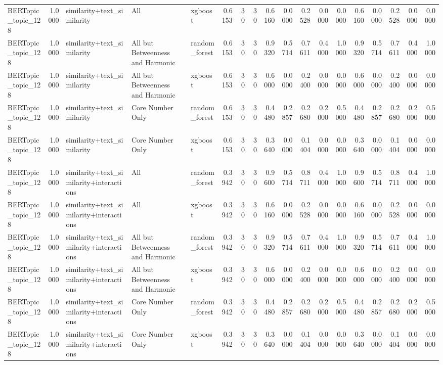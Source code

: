 \begin{tabular}{lrlllrrrrrrrrrrrrr}
BERTopic_topic_128 & 1.0000 & similarity+text_similarity & All & xgboost & 0.6153 & 30 & 30 & 0.6160 & 0.0000 & 0.2528 & 0.0000 & 0.0000 & 0.6160 & 0.0000 & 0.2528 & 0.0000 & 0.0000 \\
BERTopic_topic_128 & 1.0000 & similarity+text_similarity & All but Betweenness and Harmonic & random_forest & 0.6153 & 30 & 30 & 0.9320 & 0.5714 & 0.7611 & 0.4000 & 1.0000 & 0.9320 & 0.5714 & 0.7611 & 0.4000 & 1.0000 \\
BERTopic_topic_128 & 1.0000 & similarity+text_similarity & All but Betweenness and Harmonic & xgboost & 0.6153 & 30 & 30 & 0.6000 & 0.0000 & 0.2400 & 0.0000 & 0.0000 & 0.6000 & 0.0000 & 0.2400 & 0.0000 & 0.0000 \\
BERTopic_topic_128 & 1.0000 & similarity+text_similarity & Core Number Only & random_forest & 0.6153 & 30 & 30 & 0.4480 & 0.2857 & 0.2680 & 0.2000 & 0.5000 & 0.4480 & 0.2857 & 0.2680 & 0.2000 & 0.5000 \\
BERTopic_topic_128 & 1.0000 & similarity+text_similarity & Core Number Only & xgboost & 0.6153 & 30 & 30 & 0.3640 & 0.0000 & 0.1404 & 0.0000 & 0.0000 & 0.3640 & 0.0000 & 0.1404 & 0.0000 & 0.0000 \\
BERTopic_topic_128 & 1.0000 & similarity+text_similarity+interactions & All & random_forest & 0.3942 & 30 & 30 & 0.9600 & 0.5714 & 0.8711 & 0.4000 & 1.0000 & 0.9600 & 0.5714 & 0.8711 & 0.4000 & 1.0000 \\
BERTopic_topic_128 & 1.0000 & similarity+text_similarity+interactions & All & xgboost & 0.3942 & 30 & 30 & 0.6160 & 0.0000 & 0.2528 & 0.0000 & 0.0000 & 0.6160 & 0.0000 & 0.2528 & 0.0000 & 0.0000 \\
BERTopic_topic_128 & 1.0000 & similarity+text_similarity+interactions & All but Betweenness and Harmonic & random_forest & 0.3942 & 30 & 30 & 0.9320 & 0.5714 & 0.7611 & 0.4000 & 1.0000 & 0.9320 & 0.5714 & 0.7611 & 0.4000 & 1.0000 \\
BERTopic_topic_128 & 1.0000 & similarity+text_similarity+interactions & All but Betweenness and Harmonic & xgboost & 0.3942 & 30 & 30 & 0.6000 & 0.0000 & 0.2400 & 0.0000 & 0.0000 & 0.6000 & 0.0000 & 0.2400 & 0.0000 & 0.0000 \\
BERTopic_topic_128 & 1.0000 & similarity+text_similarity+interactions & Core Number Only & random_forest & 0.3942 & 30 & 30 & 0.4480 & 0.2857 & 0.2680 & 0.2000 & 0.5000 & 0.4480 & 0.2857 & 0.2680 & 0.2000 & 0.5000 \\
BERTopic_topic_128 & 1.0000 & similarity+text_similarity+interactions & Core Number Only & xgboost & 0.3942 & 30 & 30 & 0.3640 & 0.0000 & 0.1404 & 0.0000 & 0.0000 & 0.3640 & 0.0000 & 0.1404 & 0.0000 & 0.0000 \\

\end{tabular}

